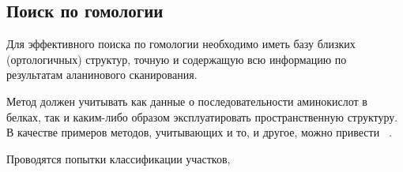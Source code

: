 \subsection{Поиск по гомологии}
Для эффективного поиска по гомологии необходимо иметь базу близких (ортологичных) структур, точную и содержащую всю информацию по результатам аланинового сканирования.

Метод должен учитывать как данные о последовательности аминокислот в белках, так и каким-либо образом эксплуатировать пространственную структуру. В качестве примеров методов, учитывающих и то, и другое, можно привести ~\cite{hhm_svm}.

Проводятся попытки классификации участков, 
